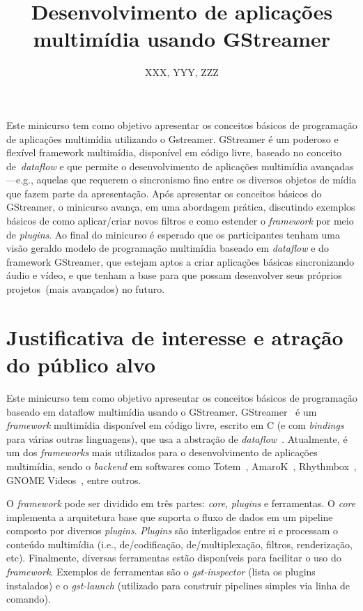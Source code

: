 \documentclass{SBCbookchapter}
\title{Desenvolvimento de aplicações multimídia usando GStreamer}
\author{XXX, YYY, ZZZ}
\begin{document}
\maketitle
\begin{abstract}
\begin{otherlanguage}{english}
\end{otherlanguage}
\end{abstract}

\begin{resumo}
Este minicurso tem como objetivo apresentar os conceitos básicos de programação
de aplicações multimídia utilizando o Gstreamer.  GStreamer é um poderoso e
flexível framework multimídia, disponível em código livre, baseado no conceito
de~\emph{dataflow} e que permite o desenvolvimento de aplicações multimídia
avançadas---e.g., aquelas que requerem o sincronismo fino entre os diversos
objetos de mídia que fazem parte da apresentação.  Após apresentar os conceitos
básicos do GStreamer, o minicurso avança, em uma abordagem prática, discutindo
exemplos básicos de como aplicar/criar novos filtros e como estender o
\emph{framework} por meio de \emph{plugins}.  Ao final do minicurso é esperado
que os participantes tenham uma visão geraldo modelo de programação multimídia
baseado em \emph{dataflow} e do framework GStreamer, que estejam aptos a criar
aplicações básicas sincronizando áudio e vídeo, e que tenham a base para que
possam desenvolver seus próprios projetos~(mais avançados) no futuro.
\end{resumo}


\section{Justificativa de interesse e atração do público alvo}
Este minicurso tem como objetivo apresentar os conceitos básicos de programação
baseado em dataflow multimídia usando o GStreamer.
GStreamer~\cite{?} é um \emph{framework} multimídia disponível em código livre,
escrito em C (e com \emph{bindings} para várias outras linguagens), que usa a
abstração de \emph{dataflow}~\cite{?}. Atualmente, é um dos \emph{frameworks}
mais utilizados para o desenvolvimento de aplicações multimídia, sendo
o \emph{backend} em softwares como Totem~\cite{?}, AmaroK~\cite{?},
Rhythmbox~\cite{?}, GNOME Videos~\cite{?}, entre outros.

O \emph{framework} pode ser dividido em três partes: \emph{core},
\emph{plugins} e ferramentas. O \emph{core} implementa a arquitetura base que
suporta o fluxo de dados em um pipeline composto por diversos \emph{plugins}. 
\emph{Plugins} são interligados entre si e processam o conteúdo multimídia
(i.e., de/codificação, de/multiplexação, filtros, renderização, etc).
Finalmente, diversas ferramentas estão disponíveis para facilitar
o uso do \emph{framework}. Exemplos de ferramentas são o 
\emph{gst-inspector} (lista os plugins instalados) e o \emph{gst-launch}
(utilizado para construir pipelines simples via linha de comando).
\end{document}
